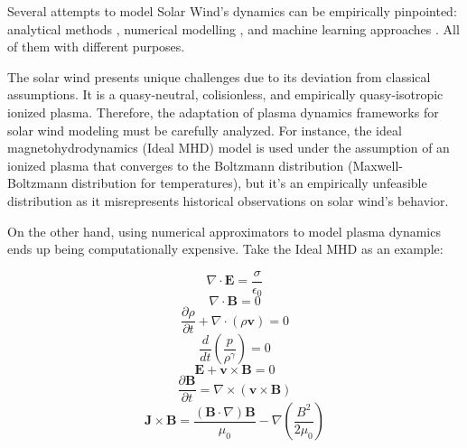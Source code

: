 \documentclass[12pt]{article}
\begin{document}
Several attempts to model Solar Wind's dynamics can be empirically pinpointed: analytical methods \cite{BLUME202396}, numerical modelling \cite{10.3389/fspas.2023.1105797, windmodelling1, Gombosi_2018}, and machine learning approaches \cite{comp_2, comp_3, guastavino2024forecastinggeoffectiveeventssolar, sabbatini2023solarwindspeedestimate, https://doi.org/10.1029/2023SW003561}. All of them with different purposes.

The solar wind presents unique challenges due to its deviation from classical assumptions. It is a quasy-neutral, colisionless, and empirically quasy-isotropic ionized plasma. \cite{Verscharen2022} Therefore, the adaptation of plasma dynamics frameworks for solar wind modeling must be carefully analyzed. For instance, the ideal magnetohydrodynamics (Ideal MHD) model is used under the assumption of an ionized plasma that converges to the Boltzmann distribution (Maxwell-Boltzmann distribution for temperatures), but it's an empirically unfeasible distribution as it misrepresents historical observations on solar wind's behavior.

On the other hand, using numerical approximators to model plasma dynamics ends up being computationally expensive. Take the Ideal MHD as an example:

\begin{equation}
    \nabla \cdot \textbf{E} = \frac{\sigma}{\epsilon_0}
\end{equation}
\begin{equation}
    \nabla \cdot \textbf{B} = 0
\end{equation}
\begin{equation}
    \frac{\partial \rho}{\partial t} + \nabla \cdot (\rho \textbf{v}) = 0
\end{equation}
\begin{equation}
    \frac{d}{dt} \left( \frac{p}{\rho^\gamma} \right)= 0
\end{equation}
\begin{equation}
    \textbf{E} + \textbf{v} \times \textbf{B} = 0
\end{equation}
\begin{equation}
    \frac{\partial \textbf{B}}{\partial t} = \nabla \times (\textbf{v} \times \textbf{B})
\end{equation}
\begin{equation}
    \textbf{J} \times \textbf{B} = \frac{(\textbf{B}\cdot \nabla) \textbf{B}}{\mu_0} - \nabla \left(\frac{B^2}{2\mu_0}\right)
\end{equation}
\end{document}
